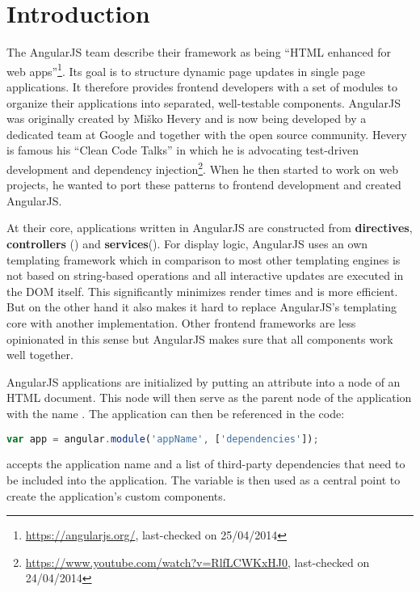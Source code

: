 \section{Introduction}

The AngularJS team describe their framework as being ``HTML enhanced for web apps''\footnote{\url{https://angularjs.org/}, last-checked on 25/04/2014}. Its goal is to structure dynamic page updates in single page applications. It therefore provides frontend developers with a set of modules to organize their applications into separated, well-testable components. AngularJS was originally created by Mi\v{s}ko Hevery and is now being developed by a dedicated team at Google and together with the open source community. Hevery is famous his ``Clean Code Talks'' in which he is advocating test-driven development and dependency injection\footnote{\url{https://www.youtube.com/watch?v=RlfLCWKxHJ0}, last-checked on 24/04/2014}. When he then started to work on web projects, he wanted to port these patterns to frontend development and created AngularJS.

At their core, applications written in AngularJS are constructed from \textbf{directives}, \textbf{controllers} () and \textbf{services}(). For display logic, AngularJS uses an own templating framework which in comparison to most other templating engines is not based on string-based operations and all interactive updates are executed in the DOM itself. This significantly minimizes render times and is more efficient. But on the other hand it also makes it hard to replace AngularJS's templating core with another implementation. Other frontend frameworks are less opinionated in this sense but AngularJS makes sure that all components work well together.

AngularJS applications are initialized by putting an  attribute into a node of an HTML document. This node will then serve as the parent node of the application with the name . The application can then be referenced in the code:

\begin{lstlisting}[language=JavaScript, caption=Initializing an AngularJS app, label=lst:angular-initialize]
  var app = angular.module('appName', ['dependencies']);
\end{lstlisting}

 accepts the application name and a list of third-party dependencies that need to be included into the application. The variable  is then used as a central point to create the application's custom components.